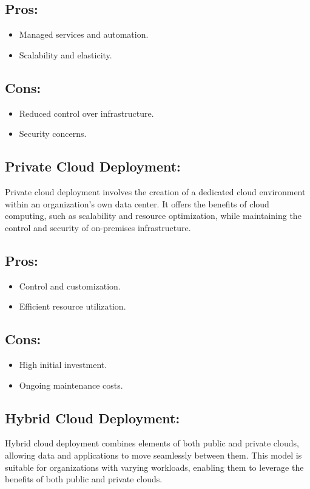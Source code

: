 \documentclass[12pt]{report}
\begin{document}
\subsection*{Pros:}
\begin{itemize}
    \item Managed services and automation.
    \item Scalability and elasticity.
\end{itemize}

\subsection*{Cons:}
\begin{itemize}
    \item Reduced control over infrastructure.
    \item Security concerns.
\end{itemize}

\subsection*{Private Cloud Deployment:}
Private cloud deployment involves the creation of a dedicated cloud environment within an organization's own data center. It offers the benefits of cloud computing, such as scalability and resource optimization, while maintaining the control and security of on-premises infrastructure.
\subsection*{Pros:}
\begin{itemize}
    \item Control and customization.
    \item Efficient resource utilization.
\end{itemize}
\subsection*{Cons:}
\begin{itemize}
    \item High initial investment.
    \item Ongoing maintenance costs.
\end{itemize}

\subsection*{Hybrid Cloud Deployment:}
Hybrid cloud deployment combines elements of both public and private clouds, allowing data and applications to move seamlessly between them. This model is suitable for organizations with varying workloads, enabling them to leverage the benefits of both public and private clouds.\cite{public}
\end{document}
